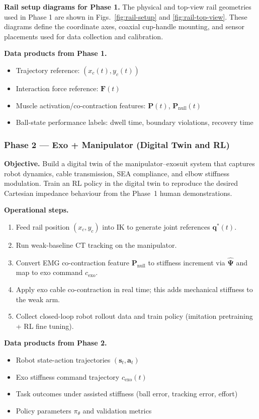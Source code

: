 \documentclass[11pt, a4paper]{article}
\newcommand{\bq}{\bm{q}}
\begin{document}
\textbf{Rail setup diagrams for Phase 1.}
The physical and top-view rail geometries used in Phase 1 are shown in
Figs.~\ref{fig:rail-setup} and \ref{fig:rail-top-view}. These diagrams define
the coordinate axes, coaxial cup-handle mounting, and sensor placements used
for data collection and calibration.

\textbf{Data products from Phase 1.}
\begin{itemize}[nosep]
  \item Trajectory reference: $(x_c(t),y_c(t))$
  \item Interaction force reference: $\mathbf F(t)$
  \item Muscle activation/co-contraction features: $\mathbf P(t)$, $\mathbf P_{\text{null}}(t)$
  \item Ball-state performance labels: dwell time, boundary violations, recovery time
\end{itemize}

\subsubsection{Phase 2 --- Exo + Manipulator (Digital Twin and RL)}
\textbf{Objective.} Build a digital twin of the manipulator--exosuit system that captures robot dynamics, cable transmission, SEA compliance, and elbow stiffness modulation. Train an RL policy in the digital twin to reproduce the desired Cartesian impedance behaviour from the Phase~1 human demonstrations.

\textbf{Operational steps.}
\begin{enumerate}[nosep]
  \item Feed rail position $(x_c,y_c)$ into IK to generate joint references $\bq^*(t)$.
  \item Run weak-baseline CT tracking on the manipulator.
  \item Convert EMG co-contraction feature $\mathbf P_{\text{null}}$ to stiffness increment via $\hat{\boldsymbol\Psi}$ and map to exo command $c_{\text{exo}}$.
  \item Apply exo cable co-contraction in real time; this adds mechanical stiffness to the weak arm.
  \item Collect closed-loop robot rollout data and train policy (imitation pretraining + RL fine tuning).
\end{enumerate}

\textbf{Data products from Phase 2.}
\begin{itemize}[nosep]
  \item Robot state-action trajectories $(\bm s_t,\bm a_t)$
  \item Exo stiffness command trajectory $c_{\text{exo}}(t)$
  \item Task outcomes under assisted stiffness (ball error, tracking error, effort)
  \item Policy parameters $\pi_\theta$ and validation metrics
\end{itemize}
\end{document}
